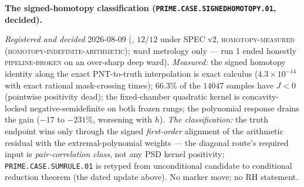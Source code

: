 \documentclass[11pt,a4paper]{article}
\begin{document}
\par\smallskip\noindent\textbf{The signed-homotopy
classification
(\texttt{PRIME.CASE.\allowbreak SIGNEDHOMOTOPY.01}, decided).}
{\sloppy
\emph{Registered and decided} 2026-08-09
(, $12/12$ under SPEC v2,
\textsc{homotopy-measured (homotopy-indefinite-arithmetic)};
ward metrology only --- run 1 ended honestly
\textsc{pipeline-broken} on an over-sharp deep ward).
\emph{Measured:} the signed homotopy identity along the exact
PNT-to-truth interpolation is exact calculus
($4.3\times10^{-14}$ with exact rational mask-crossing times);
$66.3\%$ of the $14047$ samples have $J < 0$ (pointwise
positivity dead); the fixed-chamber quadratic kernel is
concavity-locked negative-semidefinite on both frozen rungs;
the polynomial response drains the gain ($-17$ to $-231\%$,
worsening with $h$).  \emph{The classification:} the truth
endpoint wins only through the signed \emph{first-order}
alignment of the arithmetic residual with the
extremal-polynomial weights --- the diagonal route's required
input is \emph{pair-correlation class}, not any PSD kernel
positivity; \texttt{PRIME.CASE.SUMRULE.01} is retyped from
unconditional candidate to conditional reduction theorem (the
dated update above).  No marker move; no RH statement.\par}
\end{document}
